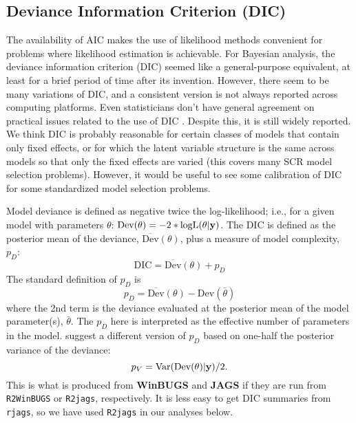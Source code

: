 \subsection{Deviance Information Criterion (DIC) }

The availability of AIC makes the use of likelihood methods convenient
for problems where likelihood estimation is achievable.  For Bayesian
analysis, the deviance information criterion (DIC) seemed like a
general-purpose equivalent, at least for a brief period of time after
its invention.  However, there seem to be many variations of DIC, and
a consistent version is not always reported across computing
platforms.
Even statisticians don't have general agreement on practical issues
related to the use of DIC \citep{millar:2009}.
Despite this, it is
still widely reported. We think DIC is probably reasonable for certain
classes of models that contain only fixed effects, or for which the
latent variable structure is the same across models so that only the
fixed effects are varied (this covers many SCR model selection
problems).  However, it would be useful to see some calibration of DIC
for some standardized model selection problems.

Model deviance is defined as negative twice the log-likelihood;
i.e., for a given model with parameters $\theta$: $\mbox{Dev}(\theta) =
-2*\mbox{logL}(\theta|{\bf y})$.  The DIC is defined as the
posterior mean of the deviance, $\overline{\mbox{Dev}}(\theta)$, plus a measure of model complexity,
$p_{D}$:
\[
 \mbox{DIC} = \overline{\mbox{Dev}}(\theta) + p_{D}
\]
The standard definition of $p_{D}$ is
\[
 p_{D} = \overline{\mbox{Dev}}(\theta) - \mbox{Dev}(\bar{\theta})
\]
where the 2nd term is the deviance evaluated at the posterior mean of
the model parameter(s), $\bar{\theta}$. The $p_{D}$ here is interpreted as the effective
number of parameters in the model.  \citet{gelman_etal:2004} suggest a
different version of $p_{D}$ based on one-half the posterior variance
of the deviance:
\[
 p_{V} = \mbox{Var}(\mbox{Dev}(\theta)|{\bf y})/2.
\]
This is what is produced from {\bf WinBUGS} and {\bf JAGS} if they are
run from \mbox{\tt R2WinBUGS} or \mbox{\tt R2jags}, respectively.  It
is less easy to get DIC summaries from \mbox{\tt rjags}, so we have
used \mbox{\tt R2jags} in our analyses below.


